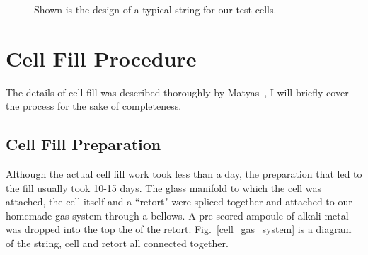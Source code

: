 \begin{figure}[t!]
	\centering
	\caption{{Shown is the design of a typical string for our test cells.}}
	\label{string}
\end{figure}

\section{Cell Fill Procedure}

The details of cell fill was described thoroughly by Matyas~\cite{DanThesis}, I will briefly cover the process for the sake of completeness.

\subsection{Cell Fill Preparation}

Although the actual cell fill work took less than a day, the preparation that led to the fill usually took 10-15 days. The glass manifold to which the cell was attached, the cell itself and a ``retort" were spliced together and attached to our homemade gas system through a bellows. A pre-scored ampoule of alkali metal was dropped into the top the of the retort.  Fig.~\ref{cell_gas_system} is a diagram of the string, cell and retort all connected together. 

